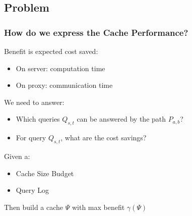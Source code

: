 \subsection{Problem}
\begin{frame}[red] %
\frametitle{How do we express the Cache Performance?}

  Benefit is expected cost saved:
    \begin{itemize}
    \item On server: computation time
    \item On proxy: communication time
    \end{itemize}

\vspace{1.5em}

We need to answer:
\begin{itemize}
    \item Which queries $Q_{s,t}$ can be answered by the path $P_{a,b}$?
    \item For query $Q_{s,t}$, what are the cost savings?
\end{itemize}

\vspace{1.5em}
  Given a: 
    \begin{itemize}
    \item Cache Size Budget 
    \item Query Log
    \end{itemize}
  Then build a cache $\Psi$ with max benefit $\gamma(\Psi)$\\
\end{frame}


